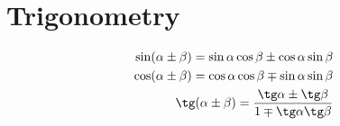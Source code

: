 \section{Trigonometry}
\begin{align*}
	\sin (\alpha \pm \beta) = \sin \alpha \cos \beta \pm \cos \alpha \sin \beta \\
	\cos (\alpha \pm \beta) = \cos \alpha \cos \beta \mp \sin \alpha \sin \beta \\
	\tg (\alpha \pm \beta) = \frac{\tg \alpha \pm \tg \beta}{1 \mp \tg \alpha \tg \beta}
\end{align*}

